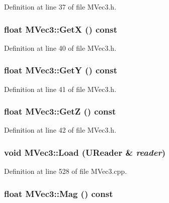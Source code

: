 Definition at line 37 of file MVec3.h.\hypertarget{class_m_vec3_8b834219441d8d65b3e4df28fe03f60f}{
\subsubsection[{GetX}]{\setlength{\rightskip}{0pt plus 5cm}float MVec3::GetX () const}}
\label{class_m_vec3_8b834219441d8d65b3e4df28fe03f60f}




Definition at line 40 of file MVec3.h.\hypertarget{class_m_vec3_dfadf4adb521222d91980376a7679dc8}{
\subsubsection[{GetY}]{\setlength{\rightskip}{0pt plus 5cm}float MVec3::GetY () const}}
\label{class_m_vec3_dfadf4adb521222d91980376a7679dc8}




Definition at line 41 of file MVec3.h.\hypertarget{class_m_vec3_8b29390479c105bbb9926188b9742329}{
\subsubsection[{GetZ}]{\setlength{\rightskip}{0pt plus 5cm}float MVec3::GetZ () const}}
\label{class_m_vec3_8b29390479c105bbb9926188b9742329}




Definition at line 42 of file MVec3.h.\hypertarget{class_m_vec3_8f6e9444531a6da0042b47780dd21cbb}{
\subsubsection[{Load}]{\setlength{\rightskip}{0pt plus 5cm}void MVec3::Load ({\bf UReader} \& {\em reader})}}
\label{class_m_vec3_8f6e9444531a6da0042b47780dd21cbb}




Definition at line 528 of file MVec3.cpp.\hypertarget{class_m_vec3_5dfd83de3ed52ac479d69a1c8407d495}{
\subsubsection[{Mag}]{\setlength{\rightskip}{0pt plus 5cm}float MVec3::Mag () const}}
\label{class_m_vec3_5dfd83de3ed52ac479d69a1c8407d495}




